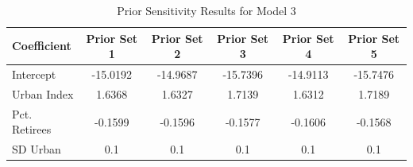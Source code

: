 \documentclass[12pt]{article}
\begin{document}
\begin{table}[h]
    \centering
    \caption{Prior Sensitivity Results for Model 3}
    \label{tab:Prior Sensitivity Results for Model 3}
    \begin{tabular}{l|ccccc}
        \hline
        Coefficient    & Prior Set 1 & Prior Set 2 & Prior Set 3 & Prior Set 4 & Prior Set 5 \\
        \hline
        Intercept      & -15.0192 & -14.9687 & -15.7396 & -14.9113 & -15.7476 \\
        Urban Index    & 1.6368 & 1.6327 & 1.7139 & 1.6312 & 1.7189 \\
        Pct. Retirees  & -0.1599 & -0.1596 & -0.1577 & -0.1606 & -0.1568 \\
        SD Urban       & 0.1    & 0.1    & 0.1     & 0.1    & 0.1     \\
        \hline
    \end{tabular}
    
\end{table}






\FloatBarrier

\clearpage
\newpage
\printbibliography
\end{document}
